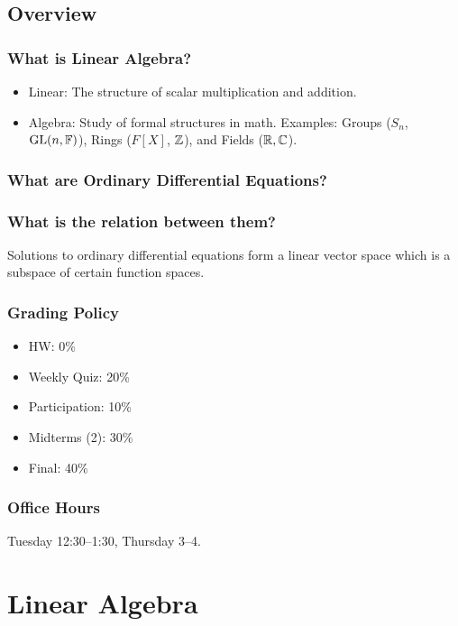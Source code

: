 \section{Overview}

\subsection{What is Linear Algebra?}
\begin{itemize}
    \item Linear: The structure of scalar multiplication and addition.
    \item Algebra: Study of formal structures in math. Examples: Groups ($S_n$, $\mathrm{GL}(n, \mathbb F)$), Rings ($F[X]$, $\mathbb Z$), and Fields ($\mathbb R, \mathbb C$).
\end{itemize}

\subsection{What are Ordinary Differential Equations?}

\subsection{What is the relation between them?}

Solutions to ordinary differential equations form a linear vector space which is a subspace of certain function spaces.

\subsection{Grading Policy}
\begin{itemize}
    \item HW: 0\%
    \item Weekly Quiz: 20\%
    \item Participation: 10\%
    \item Midterms (2): 30\%
    \item Final: 40\%
\end{itemize}

\subsection{Office Hours}
Tuesday 12:30--1:30, Thursday 3--4.

\chapter{Linear Algebra}

